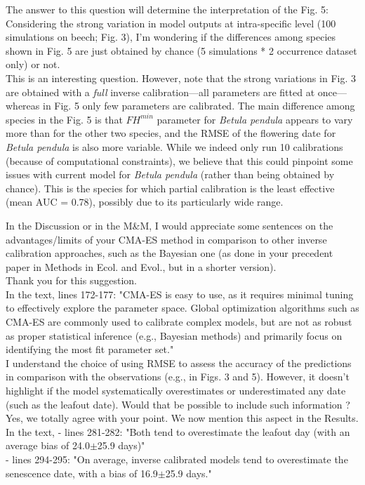\documentclass[a4paper, 11pt]{article}
\begin{document}
\noindent The answer to this question will determine the interpretation of the Fig. 5: Considering the strong variation in model outputs at intra-specific level (100 simulations on beech; Fig. 3), I'm wondering if the differences among species shown in Fig. 5 are just obtained by chance (5 simulations * 2 occurrence dataset only) or not.\\
\textcolor{customblue}{This is an interesting question. However, note that the strong variations in Fig. 3 are obtained with a \emph{full} inverse calibration---all parameters are fitted at once---whereas in Fig. 5 only few parameters are calibrated. The main difference among species in the Fig. 5 is that $FH^{min}$ parameter for \emph{Betula pendula} appears to vary more than for the other two species, and the RMSE of the flowering date for \emph{Betula pendula}  is also more variable. While we indeed only run 10 calibrations (because of computational constraints), we believe that this could pinpoint some issues with current model for  \emph{Betula pendula} (rather than being obtained by chance). This is the species for which partial calibration is the least effective (mean AUC = 0.78), possibly due to its particularly wide range.}\\

\clearpage

\noindent In the Discussion or in the M\&M, I would appreciate some sentences on the advantages/limits of your CMA-ES method in comparison to other inverse calibration approaches, such as the Bayesian one (as done in your precedent paper in Methods in Ecol. and Evol., but in a shorter version).\\
\textcolor{customblue}{Thank you for this suggestion.}\\
In the text, lines 172-177: \textcolor{customred}{"CMA-ES is easy to use, as it requires minimal tuning to effectively explore the parameter space. Global optimization algorithms such as CMA-ES are commonly used to calibrate complex models, but are not as robust as proper statistical inference (e.g., Bayesian methods) and primarily focus on identifying the most fit parameter set."}\\ 

\noindent I understand the choice of using RMSE to assess the accuracy of the predictions in comparison with the observations (e.g., in Figs. 3 and 5). However, it doesn't highlight if the model systematically overestimates or underestimated any date (such as the leafout date). Would that be possible to include such information ?\\
\textcolor{customblue}{Yes, we totally agree with your point.  We now mention this aspect in the Results.}\\
In the text, 
- lines 281-282: \textcolor{customred}{"Both tend to overestimate the leafout day (with an average bias of 24.0$\pm$25.9 days)"}\\ 
- lines 294-295: \textcolor{customred}{"On average, inverse calibrated models tend to overestimate the senescence date, with a bias of 16.9$\pm$25.9 days."}\\ 
\end{document}
